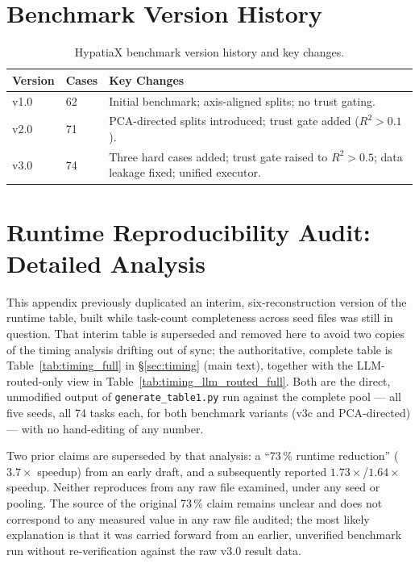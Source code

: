 \documentclass[twoside,11pt]{article}
\newcommand{\Rsq}{R^{2}}
\begin{document}
\section{Benchmark Version History}\label{sec:version_history}
\label{app:versions}

\begin{table}[h]
\centering
\caption{HypatiaX benchmark version history and key changes.}
\begin{tabular}{llp{8cm}}
\toprule
Version & Cases & Key Changes \\
\midrule
v1.0 & 62 & Initial benchmark; axis-aligned splits; no trust gating. \\
v2.0 & 71 & PCA-directed splits introduced; trust gate added ($\Rsq > 0.1$). \\
v3.0 & 74 & Three hard cases added; trust gate raised to $\Rsq > 0.5$; data leakage fixed; unified executor. \\
\bottomrule
\end{tabular}
\end{table}

\section{Runtime Reproducibility Audit: Detailed Analysis}\label{sec:runtime_correction}
\label{app:timing}

This appendix previously duplicated an interim, six-reconstruction version
of the runtime table, built while task-count completeness across seed
files was still in question. That interim table is superseded and
removed here to avoid two copies of the timing analysis drifting out of
sync; the authoritative, complete table is
Table~\ref{tab:timing_full} in \S\ref{sec:timing} (main text), together
with the LLM-routed-only view in Table~\ref{tab:timing_llm_routed_full}.
Both are the direct, unmodified output of \texttt{generate\_table1.py}
run against the complete pool --- all five seeds, all 74 tasks each, for
both benchmark variants (v3c and PCA-directed) --- with no hand-editing
of any number.

Two prior claims are superseded by that analysis: a ``73\,\% runtime
reduction'' ($3.7\times$ speedup) from an early draft, and a subsequently
reported $1.73\times$/$1.64\times$ speedup. Neither reproduces from any
raw file examined, under any seed or pooling. The source of the original
73\,\% claim remains unclear and does not correspond to any measured
value in any raw file audited; the most likely explanation is that it was
carried forward from an earlier, unverified benchmark run without
re-verification against the raw v3.0 result data.
\end{document}
